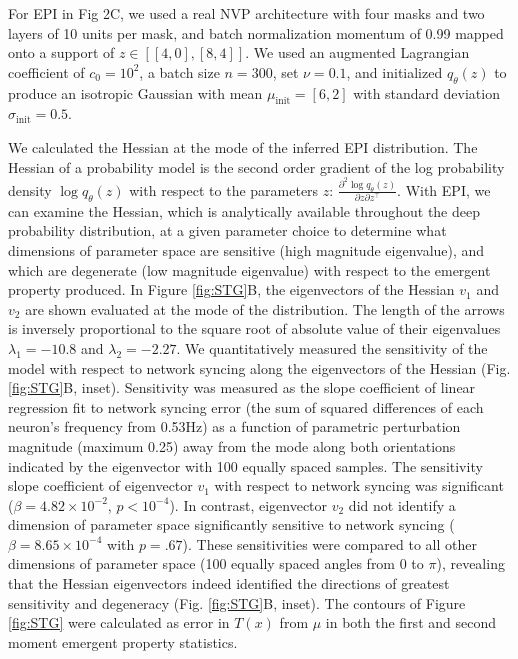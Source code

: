 \documentclass[11pt]{article}
\begin{document}
For EPI in Fig 2C, we used a real NVP architecture with four masks and two layers of 10 units per mask, and batch normalization momentum of 0.99 mapped onto a support of $z \in \left[ [4, 0], [8, 4] \right]$. We used an augmented Lagrangian coefficient of $c_0 = 10^{2}$, a batch size $n=300$, set $\nu = 0.1$, and initialized $q_\theta(z)$ to produce an isotropic Gaussian with mean $\mu_{\text{init}} = [6, 2]$ with standard deviation $\sigma_{\text{init}} = 0.5$.

We calculated the Hessian at the mode of the inferred EPI distribution.  
The Hessian of a probability model is the second order gradient of the log probability density $\log q_\theta(z)$ with respect to the parameters $z$:  $\frac{\partial^2 \log q_\theta(z)}{\partial z \partial z^\top}$.  
With EPI, we can examine the Hessian, which is analytically available throughout the deep probability distribution, at a given parameter choice to determine what dimensions of parameter space are sensitive (high magnitude eigenvalue), and which are degenerate (low magnitude eigenvalue) with respect to the emergent property produced. 
In Figure \ref{fig:STG}B, the eigenvectors of the Hessian $v_1$ and $v_2$ are shown evaluated at the mode of the distribution.  
The length of the arrows is inversely proportional to the square root of absolute value of their eigenvalues $\lambda_1 = -10.8$ and $\lambda_2 = -2.27$.
We quantitatively measured the sensitivity of the model with respect to network syncing along the eigenvectors of the Hessian (Fig. \ref{fig:STG}B, inset).
Sensitivity was measured as the slope coefficient of linear regression fit to network syncing error (the sum of squared differences of each neuron's frequency from 0.53Hz) as a function of parametric perturbation magnitude (maximum 0.25) away from the mode along both orientations indicated by the eigenvector with 100 equally spaced samples.
The sensitivity slope coefficient of eigenvector $v_1$ with respect to network syncing was significant ($\beta = 4.82 \times 10^{-2}$, $p<10^{-4}$).
In contrast, eigenvector $v_2$ did not identify a dimension of parameter space significantly sensitive to network syncing ($\beta = 8.65 \times 10^{-4}$ with $p=.67$).
These sensitivities were compared to all other dimensions of parameter space (100 equally spaced angles from 0 to $\pi$), revealing that the Hessian eigenvectors indeed identified the directions of greatest sensitivity and degeneracy (Fig. \ref{fig:STG}B, inset).
The contours of Figure \ref{fig:STG} were calculated as error in $T(x)$ from $\mu$ in both the first and second moment emergent property statistics.
\end{document}
